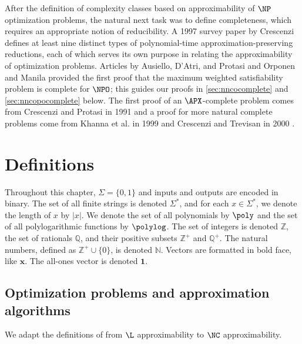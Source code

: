 After the definition of complexity classes based on approximability of $\NP$ optimization problems, the natural next task was to define completeness, which requires an appropriate notion of reducibility.
A 1997 survey paper by Crescenzi \autocite{crescenzi97} defines at least nine distinct types of polynomial-time approximation-preserving reductions, each of which serves its own purpose in relating the approximability of optimization problems.
Articles by Ausiello, D'Atri, and Protasi \autocite{adp81} and Orponen and Manila \autocite{om87} provided the first proof that the maximum weighted satisfiability problem is complete for $\NPO$; this guides our proofs in \autoref{sec:nncocomplete} and \autoref{sec:nncopocomplete} below.
The first proof of an $\APX$-complete problem comes from Crescenzi and Protasi in 1991 \autocite{cp91} and a proof for more natural complete problems come from Khanna et al. in 1999 \autocite{kmsv98} and Crescenzi and Trevisan in 2000 \autocite{ct00}.


\section{Definitions}

Throughout this chapter, $\Sigma=\{0, 1\}$ and inputs and outputs are encoded in binary.
The set of all finite strings is denoted $\Sigma^*$, and for each $x \in \Sigma^*$, we denote the length of $x$ by $|x|$.
We denote the set of all polynomials by $\poly$ and the set of all polylogarithmic functions by $\polylog$.
The set of integers is denoted $\mathbb{Z}$, the set of rationals $\mathbb{Q}$, and their positive subsets $\mathbb{Z}^+$ and $\mathbb{Q}^+$.
The natural numbers, defined as $\mathbb{Z}^+ \cup \{0\}$, is denoted $\mathbb{N}$.
Vectors are formatted in bold face, like $\mathbf{x}$.
The all-ones vector is denoted $\mathbf{1}$.

\subsection{Optimization problems and approximation algorithms}

We adapt the definitions of \cite{tantau07} from $\L$ approximability to $\NC$ approximability.

